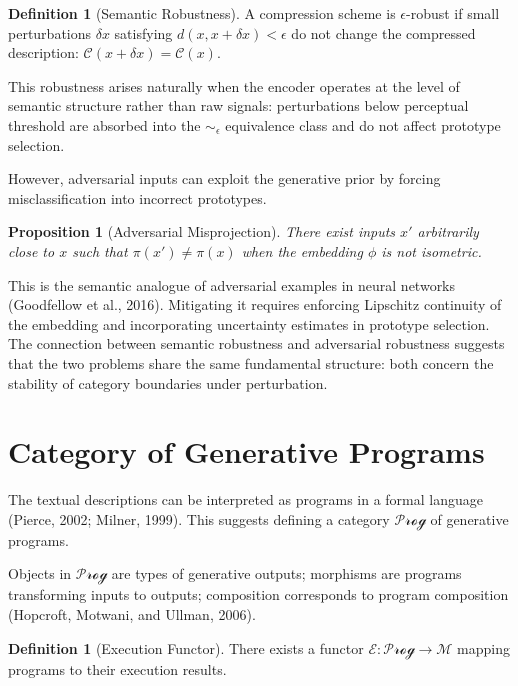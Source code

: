 \documentclass[11pt,a4paper]{article}
\newtheorem{proposition}[theorem]{Proposition}
\theoremstyle{definition}
\newtheorem{definition}[theorem]{Definition}
\theoremstyle{remark}
\begin{document}
\begin{definition}[Semantic Robustness]
A compression scheme is $\epsilon$-robust if small perturbations $\delta x$ satisfying $d(x, x+\delta x) < \epsilon$ do not change the compressed description: $\mathcal{C}(x + \delta x) = \mathcal{C}(x)$.
\end{definition}

This robustness arises naturally when the encoder operates at the level of semantic structure rather than raw signals: perturbations below perceptual threshold are absorbed into the $\sim_\epsilon$ equivalence class and do not affect prototype selection.

However, adversarial inputs can exploit the generative prior by forcing misclassification into incorrect prototypes.

\begin{proposition}[Adversarial Misprojection]
There exist inputs $x'$ arbitrarily close to $x$ such that $\pi(x') \neq \pi(x)$ when the embedding $\phi$ is not isometric.
\end{proposition}

This is the semantic analogue of adversarial examples in neural networks (Goodfellow et al., 2016). Mitigating it requires enforcing Lipschitz continuity of the embedding and incorporating uncertainty estimates in prototype selection. The connection between semantic robustness and adversarial robustness suggests that the two problems share the same fundamental structure: both concern the stability of category boundaries under perturbation.

\section{Category of Generative Programs}
\label{sec:programs}

The textual descriptions can be interpreted as programs in a formal language (Pierce, 2002; Milner, 1999). This suggests defining a category $\mathcal{Prog}$ of generative programs.

Objects in $\mathcal{Prog}$ are types of generative outputs; morphisms are programs transforming inputs to outputs; composition corresponds to program composition (Hopcroft, Motwani, and Ullman, 2006).

\begin{definition}[Execution Functor]
There exists a functor $\mathcal{E} : \mathcal{Prog} \to \mathcal{M}$ mapping programs to their execution results.
\end{definition}
\end{document}
